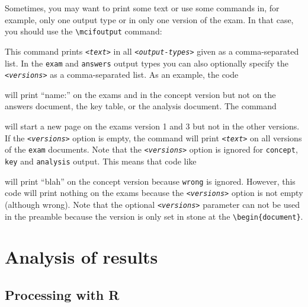\documentclass{article}
\begin{document}
Sometimes, you may want to print some text or use some commands in, for example, only one output type or in only one version of the exam. In that case, you should use the \verb$\mcifoutput$ command: 
\begin{code}[commandchars=\!\?\;]
\end{code}
This command prints \textit{\texttt{<text>}} in all \textit{\texttt{<output-types>}} given as a comma-separated list. In the \verb$exam$ and \verb$answers$ output types you can also optionally specify the \textit{\texttt{<versions>}} as a comma-separated list. As an example, the code 
\begin{code}
\end{code}
will print ``name:'' on the exams and in the concept version but not on the answers document, the key table, or the analysis document. The command 
\begin{code}
\end{code}
will start a new page on the exams version 1 and 3 but not in the other versions. If the \textit{\texttt{<versions>}} option is empty, the command will print \textit{\texttt{<text>}} on all versions of the \verb$exam$ documents. Note that the \textit{\texttt{<versions>}} option is ignored for \verb$concept$, \verb$key$ and \verb$analysis$ output. This means that code like 
\begin{code}
\end{code}
will print ``blah'' on the concept version because \verb$wrong$ is ignored. However, this code will print nothing on the exams because the \textit{\texttt{<versions>}} option is not empty (although wrong). Note that the optional \textit{\texttt{<versions>}} parameter can not be used in the preamble because the version is only set in stone at the \verb$\begin{document}$.







\section{Analysis of results\label{sec:analysis}}

  \subsection{Processing with R}
  
\end{document}
